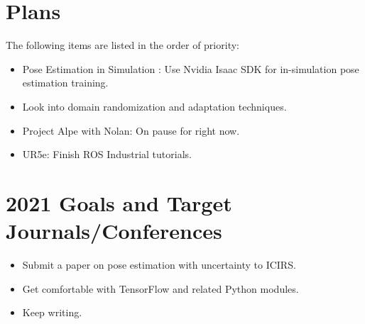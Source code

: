 \documentclass[11pt]{article}
\begin{document}

\section{Plans}
The following items are listed in the order of priority:

\begin{itemize}
      \item Pose Estimation in Simulation \cite{NVIDIAIs75:online}: Use Nvidia
      Isaac SDK for in-simulation pose estimation training.
      \item Look into domain randomization and adaptation techniques.
      \item Project Alpe with Nolan: On pause for right now.
      \item UR5e: Finish ROS Industrial tutorials.
\end{itemize}

\section{2021 Goals and Target Journals/Conferences}
\begin{itemize}
      \item Submit a paper on pose estimation with uncertainty to ICIRS.
      \item Get comfortable with TensorFlow and related Python modules.
      \item Keep writing.
\end{itemize}


\newpage


\end{document}
